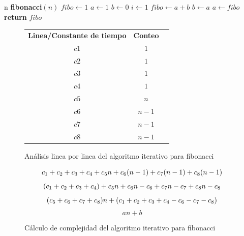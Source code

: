 \documentclass[12pt,twoside]{article}
\begin{document}
\begin{algorithmic}
    \Require n
    \State \textbf{fibonacci}$(n)$
    \State $fibo\longleftarrow1$
    \State $a\longleftarrow1$
    \State $b\longleftarrow0$
    \State $i\longleftarrow1$
        \State $fibo\longleftarrow a+b$
        \State $b\longleftarrow a$
        \State $a\longleftarrow fibo$
    \EndFor
    \State \textbf{return} $fibo$
\end{algorithmic}
\begin{figure}[ht]
    \centering
    \begin{tabular}{ |c|c|c| } 
         \hline
         \textbf{Linea/Constante de tiempo} & \textbf{Conteo} \\ 
         $c1$ & $1$ \\ 
         $c2$ & $1$ \\ 
         $c3$ & $1$ \\ 
         $c4$ & $1$ \\ 
         $c5$ & $n$ \\ 
         $c6$ & $n-1$ \\ 
         $c7$ & $n-1$ \\ 
         $c8$ & $n-1$ \\ 
         \hline
    \end{tabular}
    \caption{An\'alisis linea por linea del algoritmo iterativo para fibonacci}
    \label{fig:tabla_iterativo_fibo}
\end{figure}
\begin{figure}[ht]
    \centering
    \begin{equation}
        c\textsubscript{1}+c\textsubscript{2}+c\textsubscript{3}+c\textsubscript{4}+c\textsubscript{5}n+c\textsubscript{6}(n-1)+c\textsubscript{7}(n-1)+c\textsubscript{8}(n-1)
    \end{equation}
    \begin{equation}
        (c\textsubscript{1}+c\textsubscript{2}+c\textsubscript{3}+c\textsubscript{4})+c\textsubscript{5}n+c\textsubscript{6}n-c\textsubscript{6}+c\textsubscript{7}n-c\textsubscript{7}+c\textsubscript{8}n-c\textsubscript{8}
    \end{equation}
    \begin{equation}
        (c\textsubscript{5}+c\textsubscript{6}+c\textsubscript{7}+c\textsubscript{8})n+(c\textsubscript{1}+c\textsubscript{2}+c\textsubscript{3}+c\textsubscript{4}-c\textsubscript{6}-c\textsubscript{7}-c\textsubscript{8})
    \end{equation}
    \begin{equation}
        an+b
    \end{equation}
    \caption{C\'alculo de complejidad del algoritmo iterativo para fibonacci}
    \label{eq:demo_fibo_iterativo}
\end{figure}
\end{document}

